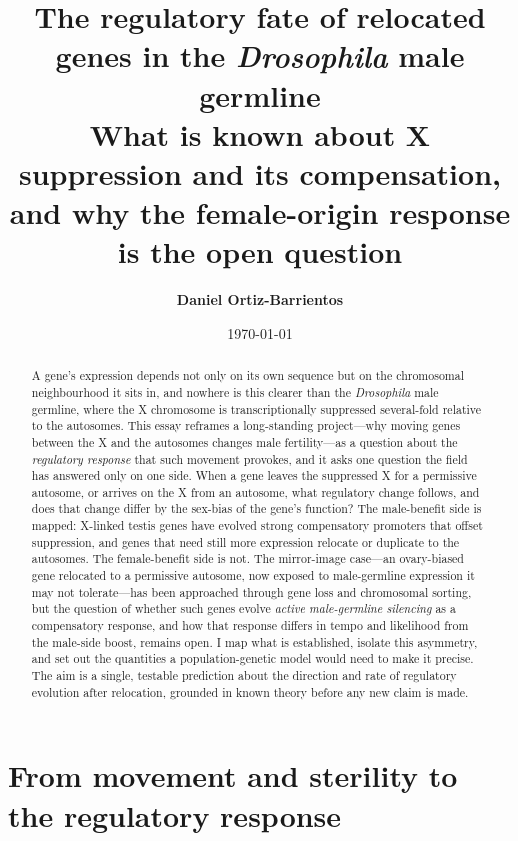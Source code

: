 \documentclass[11pt,a4paper]{article}
\title{\textbf{The regulatory fate of relocated genes in the \emph{Drosophila} male germline}\\[2pt]
\large What is known about X suppression and its compensation, and why the female-origin response is the open question}
\author{\textbf{Daniel Ortiz-Barrientos}}
\date{\today}
\begin{document}
\maketitle

\begin{abstract}
\noindent A gene's expression depends not only on its own sequence but on the chromosomal neighbourhood it sits in, and nowhere is this clearer than the \emph{Drosophila} male germline, where the X chromosome is transcriptionally suppressed several-fold relative to the autosomes. This essay reframes a long-standing project---why moving genes between the X and the autosomes changes male fertility---as a question about the \emph{regulatory response} that such movement provokes, and it asks one question the field has answered only on one side. When a gene leaves the suppressed X for a permissive autosome, or arrives on the X from an autosome, what regulatory change follows, and does that change differ by the sex-bias of the gene's function? The male-benefit side is mapped: X-linked testis genes have evolved strong compensatory promoters that offset suppression, and genes that need still more expression relocate or duplicate to the autosomes. The female-benefit side is not. The mirror-image case---an ovary-biased gene relocated to a permissive autosome, now exposed to male-germline expression it may not tolerate---has been approached through gene loss and chromosomal sorting, but the question of whether such genes evolve \emph{active male-germline silencing} as a compensatory response, and how that response differs in tempo and likelihood from the male-side boost, remains open. I map what is established, isolate this asymmetry, and set out the quantities a population-genetic model would need to make it precise. The aim is a single, testable prediction about the direction and rate of regulatory evolution after relocation, grounded in known theory before any new claim is made.
\end{abstract}

\section{From movement and sterility to the regulatory response}
\end{document}
